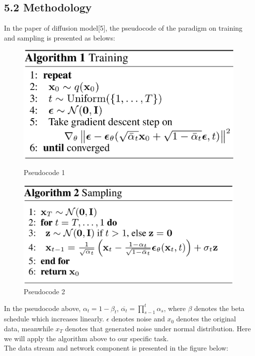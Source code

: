 \documentclass[11pt]{article}
\begin{document}
    \subsection*{5.2 Methodology}\label{methodology}

In the paper of diffusion model{[}5{]}, the pseudocode of the paradigm
on training and sampling is presented as belows:

\begin{figure}[H]
    \centering
    \begin{minipage}{0.45\textwidth}
        \centering
        \includegraphics[width=\textwidth]{image/pseudo1.png}
        \caption{Pseudocode 1}
    \end{minipage}
    \hfill
    \begin{minipage}{0.5\textwidth}
        \centering
        \includegraphics[width=\textwidth]{image/pseudo2.png}
        \caption{Pseudocode 2}
    \end{minipage}
\end{figure}

In the pseudocode above, \(\alpha_t = 1-\beta_t\),
\(\overline{\alpha_t} = \prod_{s-1}^t \alpha_s\), where \(\beta\)
denotes the beta schedule which increases linearly. \(\epsilon\) denotes
noise and \(x_0\) denotes the original data, meanwhile \(x_T\) denotes
that generated noise under normal distribution. Here we will apply the
algorithm above to our specific task.\\
The data stream and network component is presented in the figure below:
\end{document}
